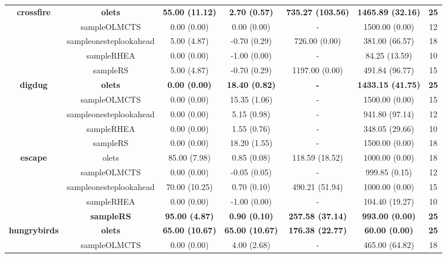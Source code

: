 \begin{table*}[!t]
\begin{center}
\begin{adjustbox}{width=1\textwidth}
\begin{tabular}{|c|c|c|c|c|c|c|}
 \\
\hline
\hline
\cline{2-7}
\multirow{5}{*}{\textbf{crossfire}} & \textbf{olets} & \textbf{55.00 (11.12)} & \textbf{2.70 (0.57)} & \textbf{735.27 (103.56)} & \textbf{1465.89 (32.16)} & \textbf{25}
 \\
\cline{2-7}
 & sampleOLMCTS & 0.00 (0.00) & 0.00 (0.00) &  -  & 1500.00 (0.00) & 12
 \\
\cline{2-7}
 & sampleonesteplookahead & 5.00 (4.87) & -0.70 (0.29) & 726.00 (0.00) & 381.00 (66.57) & 18
 \\
\cline{2-7}
 & sampleRHEA & 0.00 (0.00) & -1.00 (0.00) &  -  & 84.25 (13.59) & 10
 \\
\cline{2-7}
 & sampleRS & 5.00 (4.87) & -0.70 (0.29) & 1197.00 (0.00) & 491.84 (96.77) & 15
 \\
\hline
\hline
\cline{2-7}
\multirow{5}{*}{\textbf{digdug}} & \textbf{olets} & \textbf{0.00 (0.00)} & \textbf{18.40 (0.82)} & \textbf{ - } & \textbf{1433.15 (41.75)} & \textbf{25}
 \\
\cline{2-7}
 & sampleOLMCTS & 0.00 (0.00) & 15.35 (1.06) &  -  & 1500.00 (0.00) & 15
 \\
\cline{2-7}
 & sampleonesteplookahead & 0.00 (0.00) & 5.15 (0.98) &  -  & 941.80 (97.14) & 12
 \\
\cline{2-7}
 & sampleRHEA & 0.00 (0.00) & 1.55 (0.76) &  -  & 348.05 (29.66) & 10
 \\
\cline{2-7}
 & sampleRS & 0.00 (0.00) & 18.20 (1.55) &  -  & 1500.00 (0.00) & 18
 \\
\hline
\hline
\cline{2-7}
\multirow{5}{*}{\textbf{escape}} & olets & 85.00 (7.98) & 0.85 (0.08) & 118.59 (18.52) & 1000.00 (0.00) & 18
 \\
\cline{2-7}
 & sampleOLMCTS & 0.00 (0.00) & -0.05 (0.05) &  -  & 999.85 (0.15) & 12
 \\
\cline{2-7}
 & sampleonesteplookahead & 70.00 (10.25) & 0.70 (0.10) & 490.21 (51.94) & 1000.00 (0.00) & 15
 \\
\cline{2-7}
 & sampleRHEA & 0.00 (0.00) & -1.00 (0.00) &  -  & 104.40 (19.27) & 10
 \\
\cline{2-7}
 & \textbf{sampleRS} & \textbf{95.00 (4.87)} & \textbf{0.90 (0.10)} & \textbf{257.58 (37.14)} & \textbf{993.00 (0.00)} & \textbf{25}
 \\
\hline
\hline
\cline{2-7}
\multirow{5}{*}{\textbf{hungrybirds}} & \textbf{olets} & \textbf{65.00 (10.67)} & \textbf{65.00 (10.67)} & \textbf{176.38 (22.77)} & \textbf{60.00 (0.00)} & \textbf{25}
 \\
\cline{2-7}
 & sampleOLMCTS & 0.00 (0.00) & 4.00 (2.68) &  -  & 465.00 (64.82) & 18

\end{tabular}
\end{adjustbox}
\end{center}
\end{table*}
